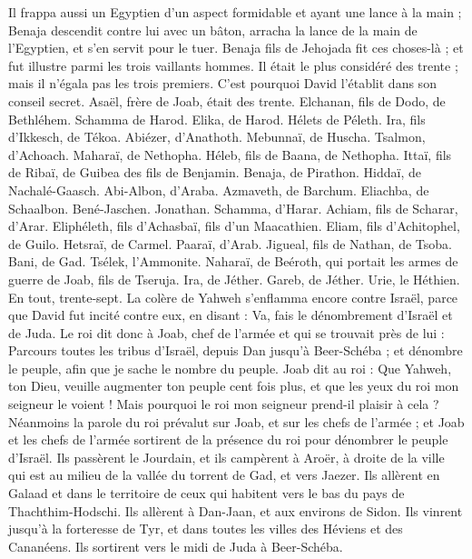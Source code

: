 \begin{multicols}{2}
Il frappa aussi un Egyptien d’un aspect formidable et ayant une lance à la main ; Benaja descendit contre lui avec un bâton, arracha la lance de la main de l'Egyptien, et s’en servit pour le tuer.
Benaja fils de Jehojada fit ces choses-là ; et fut illustre parmi les trois vaillants hommes.
Il était le plus considéré des trente ; mais il n'égala pas les trois premiers. C'est pourquoi David l'établit dans son conseil secret.
Asaël, frère de Joab, était des trente. Elchanan, fils de Dodo, de Bethléhem.
Schamma de Harod. Elika, de Harod.
Hélets de Péleth. Ira, fils d’Ikkesch, de Tékoa.
Abiézer, d’Anathoth. Mebunnaï, de Huscha.
Tsalmon, d’Achoach. Maharaï, de Nethopha.
Héleb, fils de Baana, de Nethopha. Ittaï, fils de Ribaï, de Guibea des fils de Benjamin.
Benaja, de Pirathon. Hiddaï, de Nachalé-Gaasch.
Abi-Albon, d’Araba. Azmaveth, de Barchum.
Eliachba, de Schaalbon. Bené-Jaschen. Jonathan.
Schamma, d’Harar. Achiam, fils de Scharar, d’Arar.
Eliphéleth, fils d'Achasbaï, fils d’un Maacathien. Eliam, fils d'Achitophel, de Guilo.
Hetsraï, de Carmel. Paaraï, d’Arab.
Jigueal, fils de Nathan, de Tsoba. Bani, de Gad.
Tsélek, l’Ammonite. Naharaï, de Beéroth, qui portait les armes de guerre de Joab, fils de Tseruja.
Ira, de Jéther. Gareb, de Jéther.
Urie, le Héthien. En tout, trente-sept.
\VerseOne{}La colère de Yahweh s'enflamma encore contre Israël, parce que David fut incité contre eux, en disant : Va, fais le dénombrement d'Israël et de Juda.
Le roi dit donc à Joab, chef de l'armée et qui se trouvait près de lui : Parcours toutes les tribus d'Israël, depuis Dan jusqu'à Beer-Schéba ; et dénombre le peuple, afin que je sache le nombre du peuple.
Joab dit au roi : Que Yahweh, ton Dieu, veuille augmenter ton peuple cent fois plus, et que les yeux du roi mon seigneur le voient ! Mais pourquoi le roi mon seigneur prend-il plaisir à cela ?
Néanmoins la parole du roi prévalut sur Joab, et sur les chefs de l'armée ; et Joab et les chefs de l'armée sortirent de la présence du roi pour dénombrer le peuple d’Israël.
Ils passèrent le Jourdain, et ils campèrent à Aroër, à droite de la ville qui est au milieu de la vallée du torrent de Gad, et vers Jaezer.
Ils allèrent en Galaad et dans le territoire de ceux qui habitent vers le bas du pays de Thachthim-Hodschi. Ils allèrent à Dan-Jaan, et aux environs de Sidon.
Ils vinrent jusqu'à la forteresse de Tyr, et dans toutes les villes des Héviens et des Cananéens. Ils sortirent vers le midi de Juda à Beer-Schéba.

\end{multicols}
